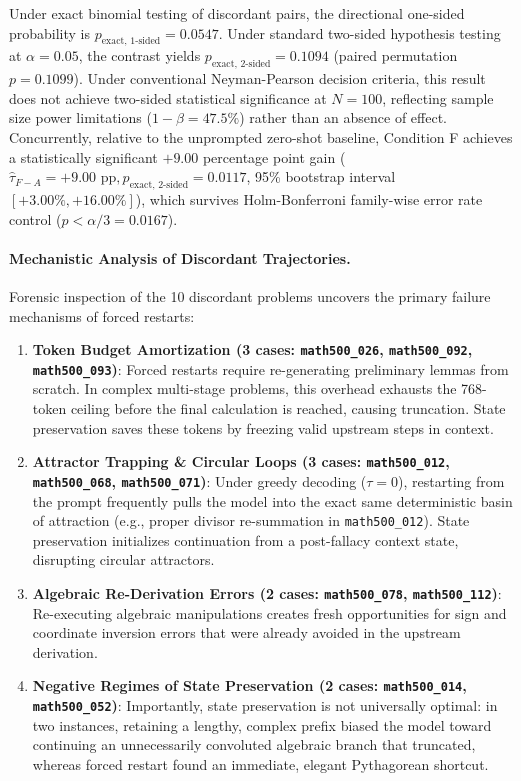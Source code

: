 \documentclass[11pt]{article}
\begin{document}
Under exact binomial testing of discordant pairs, the directional one-sided probability is $p_{\text{exact, 1-sided}} = 0.0547$. Under standard two-sided hypothesis testing at $\alpha = 0.05$, the contrast yields $p_{\text{exact, 2-sided}} = 0.1094$ (paired permutation $p = 0.1099$). Under conventional Neyman-Pearson decision criteria, this result does not achieve two-sided statistical significance at $N=100$, reflecting sample size power limitations ($1 - \beta = 47.5\%$) rather than an absence of effect. Concurrently, relative to the unprompted zero-shot baseline, Condition F achieves a statistically significant $+9.00$ percentage point gain ($\hat{\tau}_{F-A} = +9.00\text{ pp}, p_{\text{exact, 2-sided}} = 0.0117$, 95\% bootstrap interval $[+3.00\%, +16.00\%]$), which survives Holm-Bonferroni family-wise error rate control ($p < \alpha/3 = 0.0167$).

\paragraph{Mechanistic Analysis of Discordant Trajectories.}
Forensic inspection of the 10 discordant problems uncovers the primary failure mechanisms of forced restarts:
\begin{enumerate}
    \item \textbf{Token Budget Amortization (3 cases: \texttt{math500\_026}, \texttt{math500\_092}, \texttt{math500\_093})}: Forced restarts require re-generating preliminary lemmas from scratch. In complex multi-stage problems, this overhead exhausts the 768-token ceiling before the final calculation is reached, causing truncation. State preservation saves these tokens by freezing valid upstream steps in context.
    \item \textbf{Attractor Trapping \& Circular Loops (3 cases: \texttt{math500\_012}, \texttt{math500\_068}, \texttt{math500\_071})}: Under greedy decoding ($\tau = 0$), restarting from the prompt frequently pulls the model into the exact same deterministic basin of attraction (e.g., proper divisor re-summation in \texttt{math500\_012}). State preservation initializes continuation from a post-fallacy context state, disrupting circular attractors.
    \item \textbf{Algebraic Re-Derivation Errors (2 cases: \texttt{math500\_078}, \texttt{math500\_112})}: Re-executing algebraic manipulations creates fresh opportunities for sign and coordinate inversion errors that were already avoided in the upstream derivation.
    \item \textbf{Negative Regimes of State Preservation (2 cases: \texttt{math500\_014}, \texttt{math500\_052})}: Importantly, state preservation is not universally optimal: in two instances, retaining a lengthy, complex prefix biased the model toward continuing an unnecessarily convoluted algebraic branch that truncated, whereas forced restart found an immediate, elegant Pythagorean shortcut.
\end{enumerate}
\end{document}
